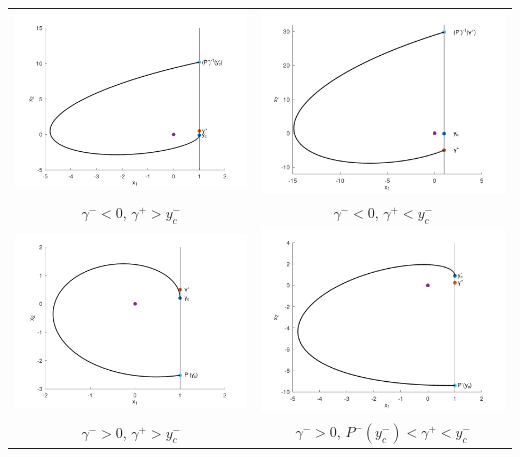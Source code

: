 \begin{table}[H]
\centering
\begin{tabular}{cc}
\includegraphics[width=7cm]{aaaaaa}
&
\includegraphics[width=7cm]{dddddd}\\
\small$\gamma^-<0$, $\gamma^+>y_c^-$&\small$\gamma^-<0$, $\gamma^+<y_c^-$\\
\includegraphics[width=7cm]{cccccc}
&
\includegraphics[width=7cm]{bbbbbb}\\
\small$\gamma^->0$, $\gamma^+>y_c^-$&\small$\gamma^->0$, $P^-(y_c^-)<\gamma^+<y_c^-$
\end{tabular}
\end{table}
